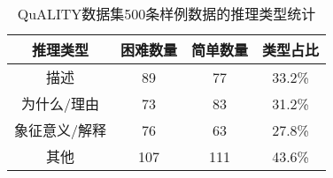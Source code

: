 \begin{table}[htbp]
    \centering
    \caption{QuALITY数据集500条样例数据的推理类型统计}
    \label{tab:2-6}
    \begin{tabular}{cccc}
        \hline
        推理类型 & 困难数量 & 简单数量 & 类型占比 \\
        \hline
        描述 & 89 & 77 & 33.2\%  \\
        为什么/理由 & 73 & 83 & 31.2\%  \\
        象征意义/解释 & 76 & 63 & 27.8\%  \\
        其他 & 107 & 111 & 43.6\%  \\
        \hline
    \end{tabular}
\end{table}

